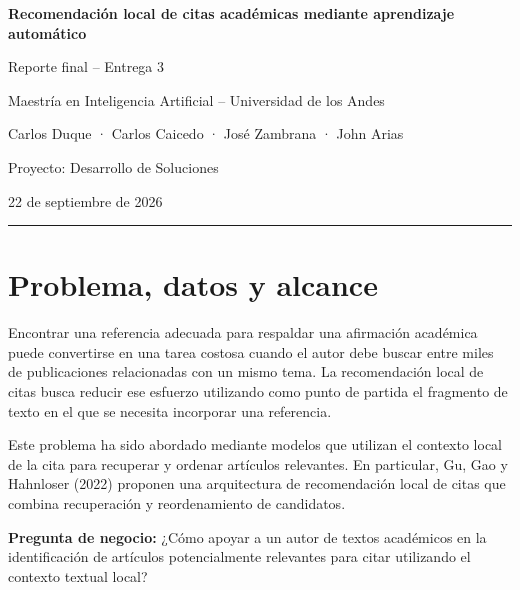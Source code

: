 \documentclass[9pt]{article}
\newcommand{\notabox}[1]{
\begin{tcolorbox}[
    colback=lightgray,
    colframe=accentblue,
    boxrule=0.5pt,
    left=5pt,
    right=5pt,
    top=3pt,
    bottom=3pt,
    arc=1pt
]
\footnotesize #1
\end{tcolorbox}
}
\begin{document}

\begin{center}

{\Large\bfseries\color{primaryblue}
Recomendación local de citas académicas mediante aprendizaje automático
}

\vspace{2pt}

{\normalsize
Reporte final -- Entrega 3
}

\vspace{3pt}

\footnotesize
Maestría en Inteligencia Artificial -- Universidad de los Andes

Carlos Duque · Carlos Caicedo · José Zambrana · John Arias

Proyecto: Desarrollo de Soluciones

22 de septiembre de 2026

\vspace{3pt}
{\color{primaryblue}\rule{\linewidth}{0.7pt}}

\end{center}


\section{Problema, datos y alcance}

Encontrar una referencia adecuada para respaldar una afirmación académica puede
convertirse en una tarea costosa cuando el autor debe buscar entre miles de
publicaciones relacionadas con un mismo tema. La recomendación local de citas
busca reducir ese esfuerzo utilizando como punto de partida el fragmento de
texto en el que se necesita incorporar una referencia.

Este problema ha sido abordado mediante modelos que utilizan el contexto local
de la cita para recuperar y ordenar artículos relevantes. En particular, Gu,
Gao y Hahnloser (2022) proponen una arquitectura de recomendación local de citas
que combina recuperación y reordenamiento de candidatos.

\notabox{
\textbf{Pregunta de negocio:}
¿Cómo apoyar a un autor de textos académicos en la identificación de artículos
potencialmente relevantes para citar utilizando el contexto textual local?
}
\end{document}
